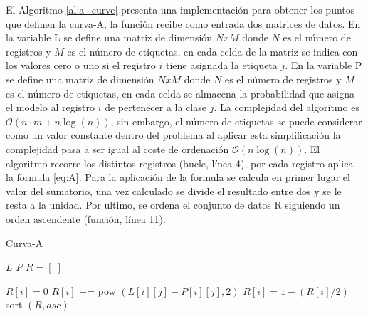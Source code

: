 El Algoritmo \ref{al:a_curve} presenta una implementación para obtener los puntos que definen la curva-A, la función recibe como entrada dos matrices de datos. En la variable L se define una matriz de dimensión $NxM$ donde $N$ es el número de registros y $M$ es el número de etiquetas, en cada celda de la matriz se indica con los valores cero o uno si el registro $i$ tiene asignada la etiqueta $j$. En la variable P se define una matriz de dimensión $NxM$ donde $N$ es el número de registros y $M$ es el número de etiquetas, en cada celda se almacena la probabilidad que asigna el modelo al registro $i$ de pertenecer a la clase $j$. La complejidad del algoritmo es $\mathcal{O}(n \cdot m + n \log(n))$, sin embargo, el número de etiquetas se puede considerar como un valor constante dentro del problema al aplicar esta simplificación la complejidad pasa a ser igual al coste de ordenación $\mathcal{O}(n \log(n))$. El algoritmo recorre los distintos registros (bucle, línea 4), por cada registro aplica la formula \ref{eq:A}. Para la aplicación de la formula se calcula en primer lugar el valor del sumatorio, una vez calculado se divide el resultado entre dos y se le resta a la unidad. Por ultimo, se ordena el conjunto de datos R siguiendo un orden ascendente (función, línea 11).

\bigbreak


\bigbreak

\begin{algorithm}
    \caption{Curva-A}
        \begin{algorithmic}[1]
            \State $L$
            \State $P$
            \State $R = [\phantom{.}]$

                \State $R[i] = 0$
                    \State $R[i]$ += pow $(L[i][j]-P[i][j], 2)$
                \EndFor
                \State $R[i] = 1 - (R[i]/2)$
            \EndFor
            \State  sort $(R, asc)$
    \end{algorithmic}
    \label{al:a_curve}
\end{algorithm}

\bigbreak

